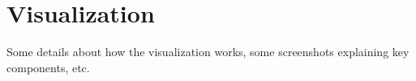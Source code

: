 \section{Visualization}
\label{sec:viz}

Some details about how the visualization works, 
some screenshots explaining key components, etc.
